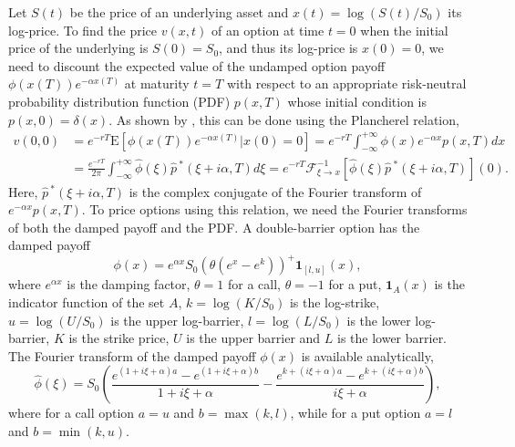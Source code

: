 \documentclass[11pt,a4paper]{article}
\begin{document}
Let $S(t)$ be the price of an underlying asset and $x(t) = \log(S(t)/S_0)$ its log-price. To find the price $v(x,t)$ of an option at time $t=0$ when the initial price of the underlying is $S(0) = S_0$, and thus its log-price is $x(0)=0$, we need to discount the expected value of the undamped option payoff $\phi(x(T))e^{-\alpha x(T)}$ at maturity $t=T$ with respect to an appropriate risk-neutral probability distribution function (PDF) $p(x,T)$ whose initial condition is $p(x,0) = \delta(x)$. As shown by
\cite{lewis2001simple}, this can be done using the Plancherel relation,
\begin{align}
v(0,0) & = e^{-rT}\mathrm{E}\left[\phi(x(T))e^{-\alpha x(T)}|x(0)=0\right]=e^{-rT}\int^{+\infty}_{-\infty}\phi(x)e^{-\alpha x}p(x,T)dx \nonumber\\
& = \frac{e^{-rT}}{2\pi}\int^{+\infty}_{-\infty}\widehat{\phi}(\xi)\widehat{p}\,^*(\xi+i\alpha,T)d\xi = e^{-rT}\mathcal{F}^{-1}_{\xi\rightarrow x}\left[\widehat{\phi}(\xi)\widehat{p}\,^*(\xi+i\alpha,T)\right](0). \label{eq:Planch}
\end{align}
Here, $\widehat{p}\,^*(\xi+i\alpha,T)$ is the complex conjugate of the Fourier transform of $e^{-\alpha x}p(x,T)$. To price options using this relation, we need the Fourier transforms of both the damped payoff and the PDF.
A double-barrier option has the damped payoff
\begin{equation}
\label{eq:damped_payoff}
\phi(x) = e^{\alpha x}S_0(\theta(e^x-e^k))^+\mathbf{1}_{[l,u]}(x),
\end{equation}
where $e^{\alpha x}$ is the damping factor, $\theta = 1$ for a call, $\theta = -1$ for a put, $\mathbf{1}_A(x)$ is the indicator function of the set $A$, $k=\log(K/S_0)$ is the log-strike, $u=\log(U/S_0)$ is the upper log-barrier, $l=\log(L/S_0)$ is the lower log-barrier, $K$ is the strike price, $U$ is the upper barrier and $L$ is the lower barrier. The Fourier transform of the damped payoff $\phi(x)$ is available analytically, %
\begin{equation}
\label{eq:Payoff}
\widehat{\phi}(\xi)=S_0\left(\frac{e^{(1+i\xi+\alpha)a}-e^{(1+i\xi+\alpha)b}}{1+i\xi+\alpha}-\frac{e^{k+(i\xi+\alpha)a}-e^{k+(i\xi+\alpha)b}}{i\xi+\alpha}\right),
\end{equation}
where for a call option $a = u$ and $b = \max(k,l)$, while for a put option $a=l$ and $b=\min(k,u)$.
\end{document}
